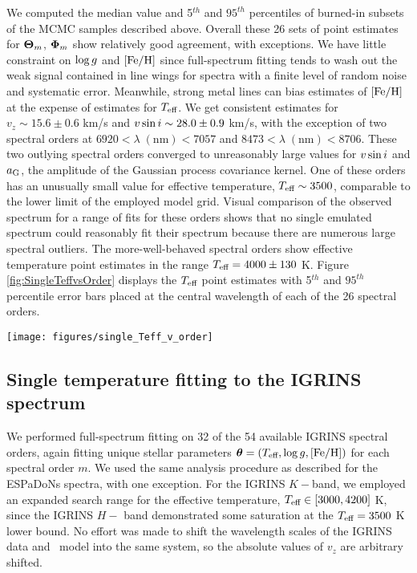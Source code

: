 \documentclass[twocolumn]{emulateapj}%
\begin{document}
We computed the median value and 5$^{th}$ and $95^{th}$ percentiles of burned-in subsets of the MCMC samples described above.  Overall these 26 sets of point estimates for ${\bm \Theta}_{m}$, ${\bm \Phi}_m$ show relatively good agreement, with exceptions.  We have little constraint on $\log g$ and $[{\rm Fe}/{\rm H}]$ since full-spectrum fitting tends to wash out the weak signal contained in line wings for spectra with a finite level of random noise and systematic error.  Meanwhile, strong metal lines can bias estimates of $[{\rm Fe}/{\rm H}]$ at the expense of estimates for $T_\textrm{eff}$.  We get consistent estimates for $v_z \sim 15.6 \pm 0.6$ km/s and $v \sin i \sim 28.0 \pm 0.9$ km/s, with the exception of two spectral orders at $6920 <\lambda \;(\mathrm{nm})< 7057$ and $8473 < \lambda \;(\mathrm{nm}) < 8706$.  These two outlying spectral orders converged to unreasonably large values for $v \sin i$ and $a_{\rm G}$, the amplitude of the Gaussian process covariance kernel.  One of these orders has an unusually small value for effective temperature, $T_\textrm{eff}\sim3500$, comparable to the lower limit of the employed model grid.  Visual comparison of the observed spectrum for a range of fits for these orders shows that no single emulated spectrum could reasonably fit their spectrum because there are numerous large spectral outliers.  The more-well-behaved spectral orders show effective temperature point estimates in the range $T_\textrm{eff}=4000\pm130$ K.  Figure \ref{fig:SingleTeffvsOrder} displays the $T_\textrm{eff}$ point estimates with 5$^{th}$ and $95^{th}$ percentile error bars placed at the central wavelength of each of the 26 spectral orders.

\begin{figure*}
	\centering
	\texttt{[image: figures/single\_Teff\_v\_order]}
	\caption{Effective temperature as derived from unique full spectrum fitting to each of 58 spectral orders in the optical through infrared portions of the spectrum assuming a single component photosphere.  }
	\label{fig:SingleTeffvsOrder}
\end{figure*}

\subsection{Single temperature fitting to the IGRINS spectrum}

We performed full-spectrum fitting on 32 of the 54 available IGRINS spectral orders, again fitting unique stellar parameters ${\bm \theta} = (T_\textrm{eff}, \log g, [{\rm Fe}/{\rm H}])$ for each spectral order $m$.  We used the same analysis procedure as described for the ESPaDoNs spectra, with one exception.  For the IGRINS $K-$band, we employed an expanded search range for the effective temperature, $T_\textrm{eff} \in [3000, 4200]$ K, since the IGRINS $H-$ band demonstrated some saturation at the $T_\textrm{eff}=3500$ K lower bound.  No effort was made to shift the wavelength scales of the IGRINS data and \PHOENIX\ model into the same system, so the absolute values of $v_z$ are arbitrary shifted.
\end{document}
